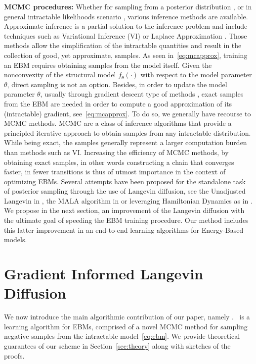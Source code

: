 \documentclass[letterpaper]{article} %
\begin{document}
\vspace{0.05in}\noindent\textbf{MCMC procedures: }
Whether for sampling from a posterior distribution \cite{mh:robert}, or in general intractable likelihoods scenario \cite{doucet2000sequential}, various inference methods are available.
Approximate inference is a partial solution to the inference problem and include techniques such as Variational Inference (VI) \cite{jordanvi,freitas} or Laplace Approximation \cite{wolfinger,rue2009approximate}. 
Those methods allow the simplification of the intractable quantities and result in the collection of good, yet approximate, samples.
As seen in~\eqref{eq:mcapprox}, training an EBM requires obtaining samples from the model itself.
Given the nonconvexity of the structural model $f_\theta(\cdot)$ with respect to the model parameter $\theta$, direct sampling is not an option.
Besides, in order to update the model parameter $\theta$, usually through gradient descent type of methods \cite{bottou2008},  exact samples from the EBM are needed in order to compute a good approximation of its (intractable) gradient, see~\eqref{eq:mcapprox}.
To do so, we generally have recourse to MCMC methods.
MCMC are a class of inference algorithms that provide a principled iterative approach to obtain samples from any intractable distribution.
While being exact, the samples generally represent a larger computation burden than methods such as VI.
Increasing the efficiency of MCMC methods, by obtaining exact samples, in other words constructing a chain that converges faster, in fewer transitions is thus of utmost importance in the context of optimizing EBMs.
Several attempts have been proposed for the standalone task of posterior sampling through the use of Langevin diffusion, see the Unadjusted Langevin in \cite{brosse2017tamed}, the MALA algorithm in \cite{roberts,robertsmala,durmus2017fast} or leveraging Hamiltonian Dynamics as in \cite{girolami}.
We propose in the next section, an improvement of the Langevin diffusion with the ultimate goal of speeding the EBM training procedure.
Our method includes this latter improvement in an end-to-end learning algorithms for Energy-Based models.

\section{Gradient Informed Langevin Diffusion}\label{sec:main}

We now introduce the main algorithmic contribution of our paper, namely \algo.
\algo\ is a learning algorithm for EBMs, comprised of a novel MCMC method for sampling negative samples from the intractable model~\eqref{eq:ebm}.
We provide theoretical guarantees of our scheme in Section~\ref{sec:theory} along with sketches of the proofs.
\end{document}
